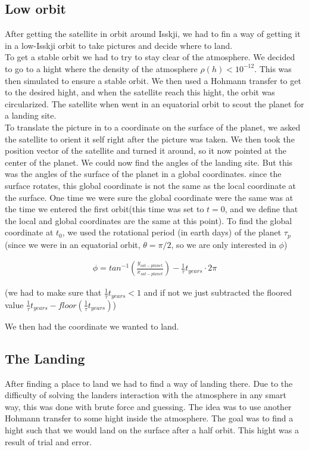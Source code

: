 \documentclass[a4paper, 10pt]{article}
\begin{document}
\subsection{Low orbit}
After getting the satellite in orbit around Isskji, we had to fin a way of getting it in a low-Isskji orbit to take pictures and decide where to land.\\

To get a stable orbit we had to try to stay clear of the atmosphere. We decided to go to a hight where the density of the atmosphere $\rho (h) < 10^{-12}$. This was then simulated to ensure a stable orbit. We then used a Hohmann transfer to get to the desired hight, and when the satellite reach this hight, the orbit was circularized. The satellite when went in an equatorial orbit to scout the planet for a landing site.\\

To translate the picture in to a coordinate on the surface of the planet, we asked the satellite to orient it self right after the picture was taken. We then took the position vector of the satellite and turned it around, so it now pointed at the center of the planet. We could now find the angles of the landing site. But this was the angles of the surface of the planet in a global coordinates. since the surface rotates, this global coordinate is not the same as the local coordinate at the surface. One time we were sure the global coordinate were the same was at the time we entered the first orbit(this time was set to $t = 0$, and we define that the local and global coordinates are the same at this point). To find the global coordinate at $t_0$, we used the rotational period (in earth days) of the planet $\tau_p$ (since we were in an equatorial orbit, $\theta = \pi /2$, so we are only interested in $\phi$)

\begin{align}
\phi = tan^{-1}\left(\frac{y_{sat-planet}}{x_{sat-planet}} \right) - \frac{1}{\tau}t_{years}\cdot 2\pi
\end{align}

(we had to make sure that $\frac{1}{\tau}t_{years} < 1$ and if not we just subtracted the floored value $\frac{1}{\tau}t_{years} - floor(\frac{1}{\tau}t_{years})$)

We then had the coordinate we wanted to land.

\subsection{The Landing}
After finding a place to land we had to find a way of landing there. Due to the difficulty of solving the landers interaction with the atmosphere in any smart way, this was done with brute force and guessing. The idea was to use another Hohmann transfer to some hight inside the atmosphere. The goal was to find a hight such that we would land on the surface after a half orbit. This hight was a result of trial and error. \\
\end{document}
